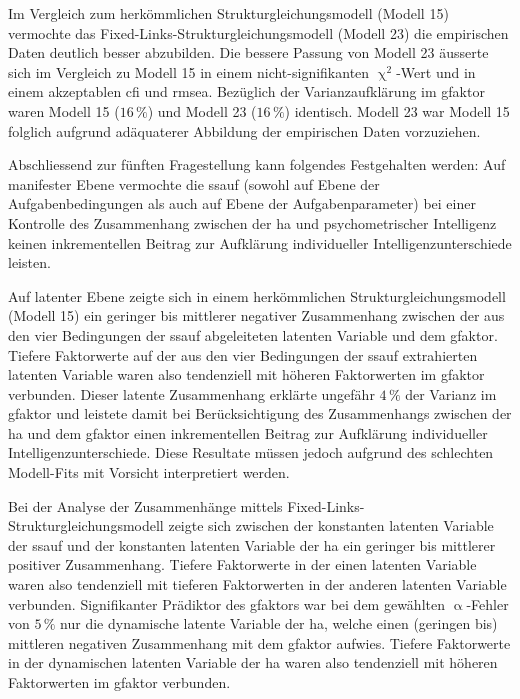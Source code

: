\documentclass[11pt, twoside, a4paper]{book}		%
\begin{document}
Im Vergleich zum herkömmlichen Strukturgleichungsmodell (Modell 15) vermochte das Fixed-Links-Strukturgleichungsmodell (Modell 23) die empirischen Daten deutlich besser abzubilden. Die bessere Passung von Modell 23 äusserte sich im Vergleich zu Modell 15 in einem nicht-signifikanten $\upchi^2$-Wert und in einem akzeptablen \gls{cfi} und \gls{rmsea}. Bezüglich der Varianzaufklärung im \gls{gfaktor} waren Modell 15 ($16\,\%$) und Modell 23 ($16\,\%$) identisch. Modell 23 war Modell 15 folglich aufgrund adäquaterer Abbildung der empirischen Daten vorzuziehen. 

Abschliessend zur fünften Fragestellung kann folgendes Festgehalten werden: 
Auf manifester Ebene vermochte die \gls{ssauf} (sowohl auf Ebene der Aufgabenbedingungen als auch auf Ebene der Aufgabenparameter) bei einer Kontrolle des Zusammenhang zwischen der \gls{ha} und psychometrischer Intelligenz keinen inkrementellen Beitrag zur Aufklärung individueller Intelligenzunterschiede leisten.

Auf latenter Ebene zeigte sich in einem herkömmlichen Strukturgleichungsmodell (Modell 15) ein geringer bis mittlerer negativer Zusammenhang zwischen der aus den vier Bedingungen der \gls{ssauf} abgeleiteten latenten Variable und dem \gls{gfaktor}. Tiefere Faktorwerte auf der aus den vier Bedingungen der \gls{ssauf} extrahierten latenten Variable waren also tendenziell mit höheren Faktorwerten im \gls{gfaktor} verbunden. 
Dieser latente Zusammenhang erklärte ungefähr $4\,\%$ der Varianz im \gls{gfaktor} und leistete damit bei Berücksichtigung des Zusammenhangs zwischen der \gls{ha} und dem \gls{gfaktor} einen inkrementellen Beitrag zur Aufklärung individueller Intelligenzunterschiede. Diese Resultate müssen jedoch aufgrund des schlechten Modell-Fits mit Vorsicht interpretiert werden.

Bei der Analyse der Zusammenhänge mittels Fixed-Links-Struk\-tur\-glei\-chungs\-mo\-dell zeigte sich zwischen der konstanten latenten Variable der \gls{ssauf} und der konstanten latenten Variable der \gls{ha} ein geringer bis mittlerer positiver Zusammenhang. Tiefere Faktorwerte in der einen latenten Variable waren also tendenziell mit tieferen Faktorwerten in der anderen latenten Variable verbunden. Signifikanter Prädiktor des \gls{gfaktor}s war bei dem gewählten $\upalpha$-Fehler von $5\,\%$ nur die dynamische latente Variable der \gls{ha}, welche einen (geringen bis) mittleren negativen Zusammenhang mit dem \gls{gfaktor} aufwies. Tiefere Faktorwerte in der dynamischen latenten Variable der \gls{ha} waren also tendenziell mit höheren Faktorwerten im \gls{gfaktor} verbunden.
\end{document}
